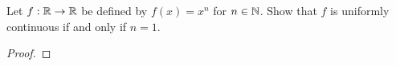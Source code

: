 \documentclass[../main.tex]{subfiles}
\begin{document}
\begin{exercise}\label{exr:13.4}
    Let $f:\mathbb{R}\to\mathbb{R}$ be defined by $f(x)=x^n$ for $n\in\mathbb{N}$. Show that $f$ is uniformly continuous if and only if $n=1$.
    \begin{proof}


\end{proof}
\end{exercise}
\end{document}
